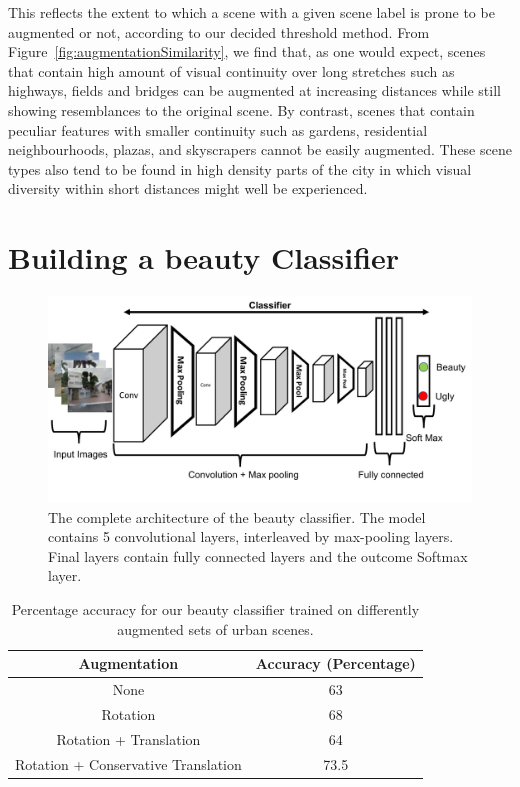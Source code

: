 This reflects the extent to which a scene with a given scene label is prone to be augmented or not, according to our decided threshold method. From Figure~\ref{fig:augmentationSimilarity}, we find that, as one would expect, scenes that contain high amount of visual continuity over long stretches such as highways, fields and bridges can be augmented at increasing distances while still showing resemblances to the original scene. By contrast, scenes that contain peculiar features with smaller continuity such as gardens, residential neighbourhoods, plazas, and skyscrapers cannot be easily augmented. These scene types also tend to be found in high density parts of the city in which visual diversity within short distances might well be experienced. 

\section{Building a beauty Classifier}

\begin{figure}[t!]
    \centering
    \includegraphics[width=\columnwidth]{Classifier_arch.pdf}
    \caption{The complete architecture of the beauty classifier. The model contains 5 convolutional layers, interleaved by max-pooling layers. Final layers contain fully connected layers and the outcome Softmax layer.}
    \label{fig:classifier_arch}
\end{figure}

\label{sec:framework}
\begin{table}[ht!]
    \centering
    \begin{tabular}{|c|c|}
        \hline
        \textbf{Augmentation} & \textbf{Accuracy (Percentage)}\\
        \hline
        None & 63 \\
        \hline
        Rotation  & 68 \\
        \hline
        Rotation + Translation  & 64 \\
        \hline
        Rotation + Conservative Translation & 73.5 \\
        \hline
    \end{tabular}
    \caption{Percentage accuracy for our beauty classifier trained on differently augmented sets of  urban scenes.}
    \label{tab:classifier}
    \vspace{-10mm}
\end{table}

